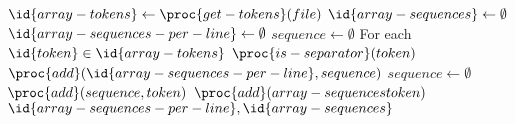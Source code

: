 \begin{codebox}
\li $\id{array-tokens} \gets \proc{get-tokens}(file)$
\li $\id{array-sequences} \gets \emptyset$
\li $\id{array-sequences-per-line} \gets \emptyset$
\li $sequence \gets \emptyset$
\li For each $\id{token} \in \id{array-tokens}$
\li \Do \If $\proc{is-separator}(token)$
\li \Then $\proc{add}(\id{array-sequences-per-line}, sequence)$
\li $sequence \gets \emptyset$
\li \Else $\proc{add}(sequence, token)$
\li $\proc{add}(array-sequences token)$ \End \End
\li \Return $\id{array-sequences-per-line}, \id{array-sequences}$
\end{codebox}